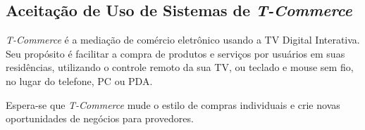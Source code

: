 \subsection{Aceitação de Uso de Sistemas de \textit{T-Commerce}}

\textit{T-Commerce} é a mediação de comércio eletrônico usando a TV Digital Interativa. Seu propósito é facilitar a compra de produtos e serviços por usuários em suas residências, utilizando o controle remoto da sua TV, ou teclado e mouse sem fio, no lugar do telefone, PC ou PDA. \cite{yu2005extending}

Espera-se que \textit{T-Commerce} mude o estilo de compras individuais e crie novas oportunidades de negócios para provedores. 
